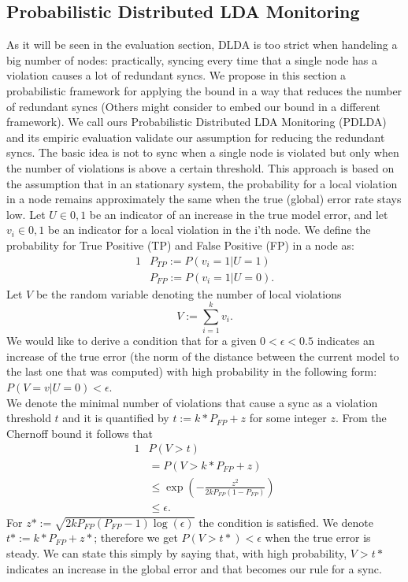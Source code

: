 \documentclass{sig-alternate-05-2015}
\begin{document}
\subsection{Probabilistic Distributed LDA Monitoring}
As it will be seen in the evaluation section, DLDA is too strict when handeling
a big number of nodes: practically, syncing every time that a single node
has a violation causes a lot of redundant syncs.
We propose in this section a probabilistic framework for applying the
bound in a way that reduces the number of redundant syncs (Others might consider
to embed our bound in a different framework). 
We call ours Probabilistic Distributed LDA Monitoring (PDLDA) and its
empiric evaluation validate our assumption for reducing the redundant syncs.
The basic idea is not to sync when a single node is violated but only 
when the number of violations is above a certain threshold. 
This approach is based on the assumption that in an stationary system, 
the probability for a local violation in a node remains approximately the same
when the true (global) error rate stays low. 
Let $U \in {0,1}$ be an indicator of an increase in the true model error,
and let $v_i \in {0,1}$ be an indicator for a local violation in the
i'th node. We define the probability for True Positive (TP) and False Positive
(FP) in a node as:
\begin{alignat*}{1}
& P_{TP} := P(v_i=1 | U=1) \\
& P_{FP} := P(v_i=1 | U=0).
\end{alignat*}
Let $V$ be the random variable denoting the number of local violations
\begin{equation*}
V := \sum_{i=1}^k v_i.
\end{equation*}
We would like to derive a condition that for a given $0 < \epsilon < 0.5$
indicates an increase of the true error (the norm of
the distance between the current model to the last one that was computed) 
with high probability in the following form:
$P(V=v|U=0) < \epsilon$.
\\We denote the minimal number of violations that cause a sync as a violation
threshold $t$ and it is quantified by $t:=k*P_{FP}+z$ for some integer $z$.
From the Chernoff bound it follows that 
\begin{alignat*}{1}
& P(V>t) \\
& = P(V>k*P_{FP}+z) \\
& \leq \exp(-\frac{z^2}{2kP_{FP}(1-P_{FP})}) \\
& \leq \epsilon.
\end{alignat*}
For $z*:=\sqrt{2kP_{FP}(P_{FP}-1)\log(\epsilon)}$ the condition is satisfied. 
We denote $t*:=k*P_{FP}+z*$; therefore we get $P(V > t*) <
\epsilon$ when the true error is steady.
We can state this simply by saying that, with high probability, $V > t*$
indicates an increase in the global error and that becomes our rule for a
sync.
\end{document}
